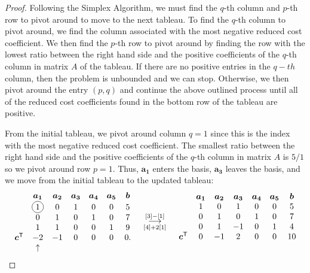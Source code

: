 \documentclass[12pt]{article}
\newcommand*\circled[1]{\tikz[baseline=(char.base)]{
            \node[shape=circle,draw,inner sep=2pt] (char) {#1};}}
\theoremstyle{definition}
\newcommand{\vect}[1]{\boldsymbol{#1}}
\newcommand{\grstep}[2][\relax]{%
   \ensuremath{\mathrel{
       {\mathop{\longrightarrow}\limits^{#2\mathstrut}_{
                                     \begin{subarray}{l} #1 \end{subarray}}}}}}
\newcommand{\tran}{\mathsf{T}}
\begin{document}
\begin{proof}
  Following the Simplex Algorithm, we must find the $q$-th column and $p$-th row to pivot around
  to move to the next tableau. To find the $q$-th column to pivot around, we find the column associated with
  the most negative reduced cost coefficient. We then find the $p$-th row to pivot
  around by finding the row with the lowest ratio between the right hand side and
  the positive coefficients of the $q$-th column in matrix $A$ of the tableau.
  If there are no positive entries in the $q-th$ column, then the problem is
  unbounded and we can stop. Otherwise, we then pivot
  around the entry $(p, q)$ and continue the above outlined process until all of the reduced
  cost coefficients found in the bottom row of the tableau are positive.

  From the initial tableau, we pivot around column
  $q=1$ since this is the index with the most negative reduced cost coefficient.
  The smallest ratio between the right hand side and the positive coefficients
  of the $q$-th column in matrix $A$ is $5/1$ so we pivot around row $p=1$. Thus, $\vect{a_1}$
  enters the basis, $\vect{a_3}$ leaves the basis, and we move from the initial tableau to the updated tableau:
  \begin{align*}
    \begin{matrix}
      & \vect{a_1} & \vect{a_2} & \vect{a_3} & \vect{a_4} & \vect{a_5} & \vect{b} \\
      & \circled{1} & 0 & 1 & 0 & 0 & 5 \\
      & 0 & 1 & 0 & 1 & 0 & 7 \\
      & 1 & 1 & 0 & 0 & 1 & 9 \\
      \vect{c}^\tran & -2 & -1 & 0 & 0 & 0 & 0. \\
      & \uparrow & & & & & \\
    \end{matrix}
    \quad
    \begin{array}{c}
    \grstep[{[4] + 2[1]}]{[3] - [1]} \\
    \end{array}
    \quad
    \begin{matrix}
      & \vect{a_1} & \vect{a_2} & \vect{a_3} & \vect{a_4} & \vect{a_5} & \vect{b} \\
                       & 1 & 0 & 1 & 0 & 0 & 5 \\
                       & 0 & 1 & 0 & 1 & 0 & 7 \\
                       & 0 & 1 & -1 & 0 & 1 & 4 \\
      \vect{c}^\tran & 0 & -1 & 2 & 0 & 0 & 10 \\
      & & & & & & \\
    \end{matrix}
  \end{align*}


\end{proof}
\end{document}
